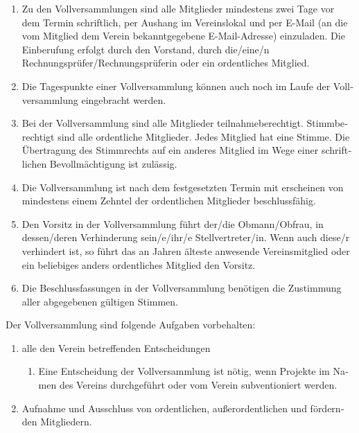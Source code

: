 \begin{otherlanguage}{german}
\begin{enumerate}[statutenenum]
    \item Zu den Vollversammlungen sind alle Mitglieder mindestens zwei Tage vor dem Termin schriftlich, per Aushang im Vereinslokal und per E-Mail (an die vom Mitglied dem Verein bekanntgegebene E-Mail-Adresse) einzuladen.
        Die Einberufung erfolgt durch den Vorstand, durch die/eine/n Rechnungsprüfer/Rechnungsprüferin oder ein ordentliches Mitglied.

    \item Die Tagespunkte einer Vollversammlung können auch noch im Laufe der Vollversammlung eingebracht werden.

    \item Bei der Vollversammlung sind alle Mitglieder teilnahmeberechtigt.
        Stimmberechtigt sind alle ordentliche Mitglieder.
        Jedes Mitglied hat eine Stimme.
        Die Übertragung des Stimmrechts auf ein anderes Mitglied im Wege einer schriftlichen Bevollmächtigung ist zulässig.

    \item Die Vollversammlung ist nach dem festgesetzten Termin mit erscheinen von mindestens einem Zehntel der ordentlichen Mitglieder beschlussfähig.

    \item Den Vorsitz in der Vollversammlung führt der/die Obmann/Obfrau, in dessen/deren Verhinderung sein/e/ihr/e Stellvertreter/in.
        Wenn auch diese/r verhindert ist, so führt das an Jahren älteste anwesende Vereinsmitglied oder ein beliebiges anders ordentliches Mitglied den Vorsitz.

    \item Die Beschlussfassungen in der Vollversammlung benötigen die Zustimmung aller abgegebenen gültigen Stimmen.
\end{enumerate}


Der Vollversammlung sind folgende Aufgaben vorbehalten:

\begin{enumerate}[statutenenum]
    \item alle den Verein betreffenden Entscheidungen
        \begin{enumerate}[statutenenum]
            \item Eine Entscheidung der Vollversammlung ist nötig, wenn Projekte im Namen des Vereins durchgeführt oder vom Verein subventioniert werden.
        \end{enumerate}
    \item Aufnahme und Ausschluss von ordentlichen, außerordentlichen und fördernden Mitgliedern.
\end{enumerate}


\end{otherlanguage}
